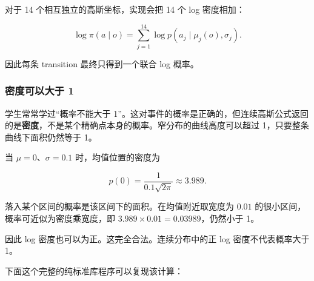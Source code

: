 \documentclass[
  chinese,
  11pt,
  letterpaper,
]{article}
\begin{document}
对于 14 个相互独立的高斯坐标，实现会把 14 个 log 密度相加：

\[
\log\pi(a\mid o)
=
\sum_{j=1}^{14}\log p(a_j\mid\mu_j(o),\sigma_j).
\]

因此每条 transition 最终只得到一个联合 log 概率。

\subsubsection{密度可以大于
1}\label{ux5bc6ux5ea6ux53efux4ee5ux5927ux4e8e-1}

学生常常学过``概率不能大于
1''。这对事件的概率是正确的，但连续高斯公式返回的是\textbf{密度}，不是某个精确点本身的概率。窄分布的曲线高度可以超过
1，只要整条曲线下面积仍然等于 1。

当 \(\mu=0\)、\(\sigma=0.1\) 时，均值位置的密度为

\[
p(0)=\frac{1}{0.1\sqrt{2\pi}}\approx3.989.
\]

落入某个区间的概率是该区间下的面积。在均值附近取宽度为 \(0.01\)
的很小区间，概率可近似为密度乘宽度，即
\(3.989\times0.01=0.03989\)，仍然小于 1。

因此 log 密度也可以为正。这完全合法。连续分布中的正 log
密度不代表概率大于 1。

下面这个完整的纯标准库程序可以复现该计算：
\end{document}

